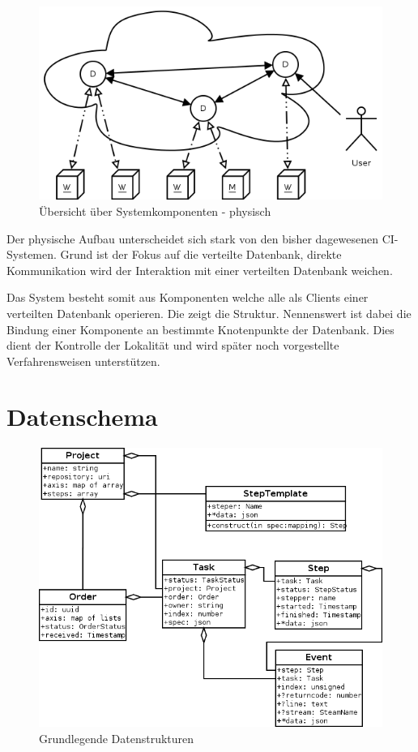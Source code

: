 \begin{figure}[ht] 
  \centering
  \includegraphics[width=\textwidth]{imageinput/grob-layout-komponenten.png}
  \caption{Übersicht über Systemkomponenten - physisch}
  \label{fig:grob-layout-komponenten}
\end{figure}

Der physische Aufbau unterscheidet sich stark von den bisher dagewesenen CI-Systemen.
Grund ist der Fokus auf die verteilte Datenbank, direkte Kommunikation
wird der Interaktion mit einer verteilten Datenbank weichen.

Das System besteht somit aus Komponenten welche alle als Clients einer verteilten Datenbank operieren.
Die  zeigt die Struktur.
Nennenswert ist dabei die Bindung einer Komponente an bestimmte Knotenpunkte der Datenbank. Dies dient der Kontrolle der Lokalität und wird später noch vorgestellte Verfahrensweisen unterstützen.


\section{Datenschema}


\begin{figure}[ht] 
  \centering
  \includegraphics[width=\textwidth]{imageinput/datenstrukturen-step-templates.png}
  \caption{Grundlegende Datenstrukturen}
  \label{fig:datenstrukturen}
\end{figure}

